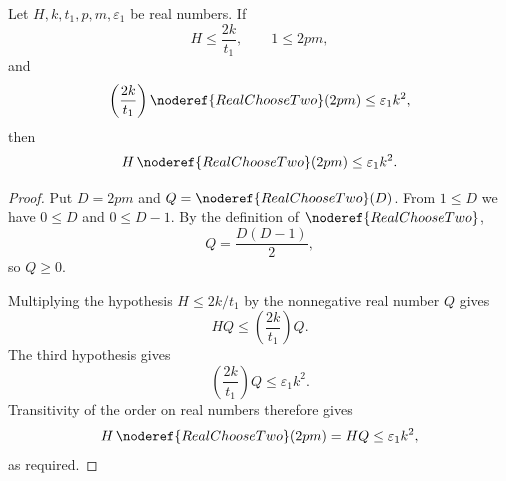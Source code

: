 \begin{lemma}
Let \(H,k,t_1,p,m,\varepsilon_1\) be real numbers.  If
\[
H\le \frac{2k}{t_1},\qquad
1\le 2pm,
\]
and
\[
\left(\frac{2k}{t_1}\right)\noderef{RealChooseTwo}(2pm)
\le \varepsilon_1 k^2,
\]
then
\[
H\,\noderef{RealChooseTwo}(2pm)\le \varepsilon_1 k^2.
\]
\end{lemma}
\begin{proof}
Put \(D=2pm\) and \(Q=\noderef{RealChooseTwo}(D)\).  From \(1\le D\) we have
\(0\le D\) and \(0\le D-1\).  By the definition of
\(\noderef{RealChooseTwo}\),
\[
Q=\frac{D(D-1)}2,
\]
so \(Q\ge0\).

Multiplying the hypothesis \(H\le 2k/t_1\) by the nonnegative real number
\(Q\) gives
\[
H Q\le \left(\frac{2k}{t_1}\right)Q.
\]
The third hypothesis gives
\[
\left(\frac{2k}{t_1}\right)Q\le \varepsilon_1 k^2.
\]
Transitivity of the order on real numbers therefore gives
\[
H\,\noderef{RealChooseTwo}(2pm)=H Q\le \varepsilon_1 k^2,
\]
as required.
\end{proof}
